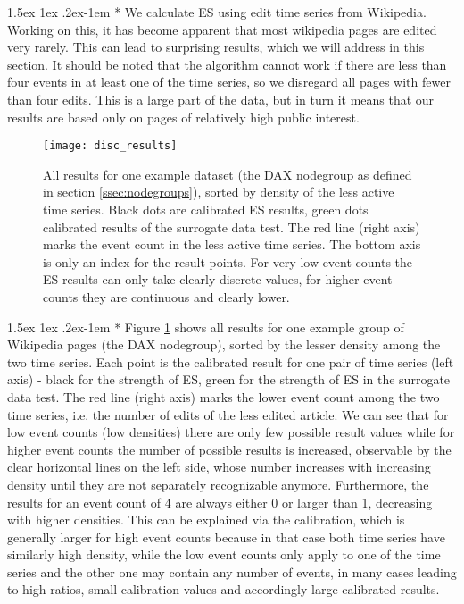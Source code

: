 \documentclass[a4paper,12pt,twoside]{article}
\makeatletter
\renewcommand{\paragraph}{%
  \@startsection{paragraph}{4}%
  {\z@}{1.5ex \@plus 1ex \@minus .2ex}{-1em}%
  {\normalfont\normalsize\bfseries}%
}
\makeatother
\begin{document}
\paragraph*{} We calculate ES using edit time series from Wikipedia. Working on this, it has become apparent that most wikipedia pages are edited very rarely. This can lead to surprising results, which we will address in this section. It should be noted that the algorithm cannot work if there are less than four events in at least one of the time series, so we disregard all pages with fewer than four edits. This is a large part of the data, but in turn it means that our results are based only on pages of relatively high public interest.
\begin{figure}[!htb]
\centering
\texttt{[image: disc\_results]}
\caption{All results for one example dataset (the DAX nodegroup as defined in section \ref{ssec:nodegroups}), sorted by density of the less active time series. Black dots are calibrated ES results, green dots calibrated results of the surrogate data test. The red line (right axis) marks the event count in the less active time series. The bottom axis is only an index for the result points. For very low event counts the ES results can only take clearly discrete values, for higher event counts they are continuous and clearly lower.}
\label{img:disc_results}
\end{figure}
\paragraph*{} Figure \ref{img:disc_results} shows all results for one example group of Wikipedia pages (the DAX nodegroup), sorted by the lesser density among the two time series. Each point is the calibrated result for one pair of time series (left axis) - black for the strength of ES, green for the strength of ES in the surrogate data test. The red line (right axis) marks the lower event count among the two time series, i.e. the number of edits of the less edited article. We can see that for low event counts (low densities) there are only few possible result values while for higher event counts the number of possible results is increased, observable by the clear horizontal lines on the left side, whose number increases with increasing density until they are not separately recognizable anymore. Furthermore, the results for an event count of 4 are always either 0 or larger than 1, decreasing with higher densities. This can be explained via the calibration, which is generally larger for high event counts because in that case both time series have similarly high density, while the low event counts only apply to one of the time series and the other one may contain any number of events, in many cases leading to high ratios, small calibration values and accordingly large calibrated results.
\end{document}
